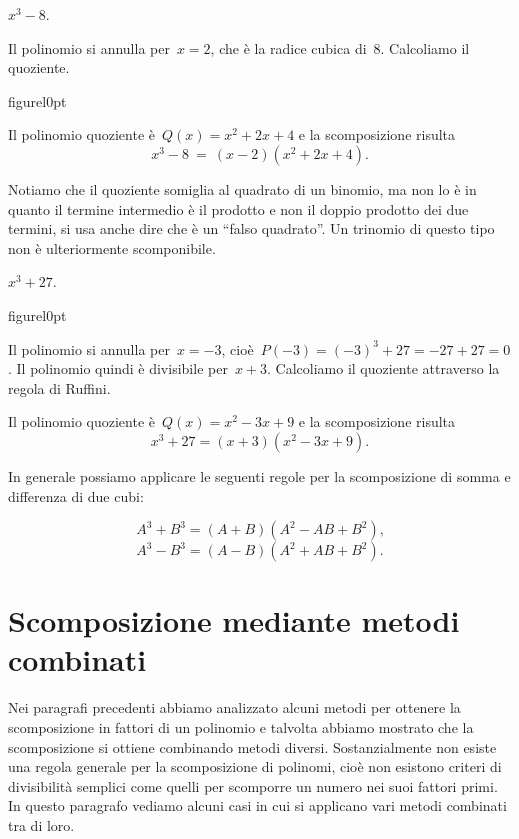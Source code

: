 \begin{exrig}
 \begin{esempio}
 $x^{3}-8$.
\end{esempio}
Il polinomio si annulla per~$x=2$, che è la radice cubica di~8.
Calcoliamo il quoziente.
\begin{wrapfloat}{figure}{l}{0pt}
 
\end{wrapfloat}
Il polinomio quoziente è~$Q(x)=x^{2}+2x+4$ e la scomposizione risulta
\[x^{3}-8\ =\ (x-2)(x^{2}+2x+4).\]

Notiamo che il quoziente somiglia al quadrato di un binomio, ma non lo
è in quanto il termine intermedio è il prodotto e non il doppio
prodotto dei due termini, si usa anche dire che è un ``falso quadrato''.
Un trinomio di questo tipo non è ulteriormente scomponibile.


 \begin{esempio}
 $x^{3}+27$.
 \end{esempio}
 \begin{wrapfloat}{figure}{l}{0pt}
 
\end{wrapfloat}
Il polinomio si annulla per~$x=-3$, cioè~$P(-3)=(-3)^{3}+27=-27+27=0$.
Il polinomio quindi è divisibile per~$x+3$. Calcoliamo il quoziente
attraverso la regola di Ruffini.

Il polinomio quoziente è~$Q(x)=x^{2}-3x+9$ e la scomposizione risulta
\[x^{3}+27=(x+3)(x^{2}-3x+9).\]

\end{exrig}

In generale possiamo applicare le seguenti regole per la scomposizione
di somma e differenza di due cubi:

\[A^{3}+B^{3}=(A+B)(A^{2}-AB+B^{2})\text{,}\]
\[A^{3}-B^{3}=(A-B)(A^{2}+AB+B^{2}).\]

\ovalbox{\risolvii \ref{ese:17.16}, \ref{ese:17.17}, \ref{ese:17.18}}

\section{Scomposizione mediante metodi combinati}

Nei paragrafi precedenti abbiamo analizzato alcuni metodi per ottenere
la scomposizione in fattori di un polinomio e talvolta abbiamo mostrato
che la scomposizione si ottiene combinando metodi diversi.
Sostanzialmente non esiste una regola generale per la scomposizione di
polinomi, cioè non esistono criteri di divisibilità semplici come
quelli per scomporre un numero nei suoi fattori primi. In questo
paragrafo vediamo alcuni casi in cui si applicano vari metodi combinati
tra di loro.

